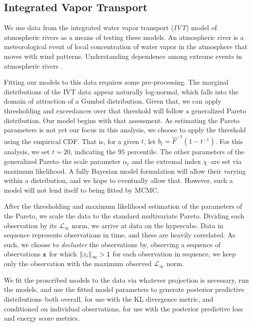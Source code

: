\subsection{Integrated Vapor Transport}
We use data from the integrated water vapor transport (\emph{IVT}) model
  of atmospheric rivers as a means of testing these models.  An atmospheric river is a meteorological
  event of local concentration of water vapor in the atmosphere that moves with wind patterns.
  Understanding dependence among extreme events in atmospheric rivers .

Fitting our models to this data requires some pre-processing.  The marginal distributions of the
  IVT data appear naturally log-normal, which falls into the domain of attraction of a Gumbel
  distribution.  Given that, we can apply thresholding and exceedances over that threshold will
  follow a generalized Pareto distribution.  Our model begins with that assessment.  As estimating
  the Pareto parameters is not yet our focus in this analysis, we choose to apply the threshold
  using the empirical CDF.  That is, for a given $t$, let $b_t = \hat{F}^{-1}(1 - t^{-1})$.  For
  this analysis, we set $t = 20$, indicating the $95$ percentile.  The other parameters of the
  generalized Pareto--the scale parameter $\alpha_t$ and the extremal index $\chi$--are set via
  maximum likelihood.  A fully Bayesian model formulation will allow their varying within a
  distribution, and we hope to eventually allow that.  However, such a model will not lend itself
  to being fitted by MCMC.

After the thresholding and maximum likelihood estimation of the parameters of the Pareto, we scale
  the data to the standard multivariate Pareto.  Dividing each observation by its
  $\mathcal{L}_{\infty}$ norm, we arrive at data on the hypercube.  Data in sequence represents
  observations in time, and these are heavily correlated.  As such, we choose to \emph{decluster}
  the observations by, observing a sequence of observations ${\bf z}$ for which $\left\lVert z_i \right\rVert_{\infty} > 1$
  for each observation in sequence, we keep only the observation with the maximum observed
  $\mathcal{L}_{\infty}$ norm.

We fit the proscribed models to the data via whatever projection is necessary, run the models, and
  use the fitted model parameters to generate posterior predictive distributions--both overall, for
  use with the KL divergence metric, and conditioned on individual observations, for use with the
  posterior predictive loss and energy score metrics.

